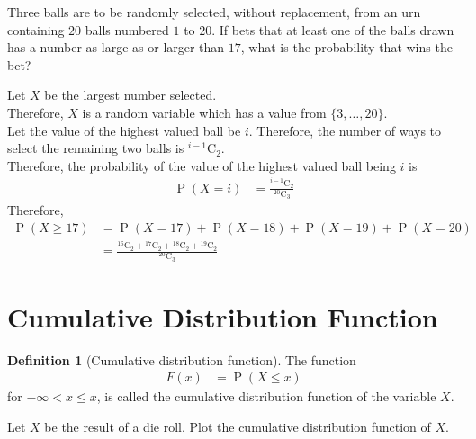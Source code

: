 \documentclass[titlepage, fleqn, a4paper, 12pt, twoside]{article}
\theoremstyle{definition}
\newtheorem{definition}{Definition}
\theoremstyle{theorem}
\DeclareMathOperator{\prob}{\mathrm{P}}
\newcommand*{\comb}[2]{{}^{#1}\mathrm{C}_{#2}}%
\newcommand{\A}{\text{Alice}\xspace}
\begin{document}
\begin{question}
	Three balls are to be randomly selected, without replacement, from an urn containing $20$ balls numbered $1$ to $20$.
	If \A bets that at least one of the balls drawn has a number as large as or larger than $17$, what is the probability that \A wins the bet?
\end{question}

\begin{solution}
	Let $X$ be the largest number selected.\\
	Therefore, $X$ is a random variable which has a value from $\{3,\dots,20\}$.\\
	Let the value of the highest valued ball be $i$.
	Therefore, the number of ways to select the remaining two balls is $\comb{i - 1}{2}$.\\
	Therefore, the probability of the value of the highest valued ball being $i$ is
	\begin{align*}
		\prob(X = i) & = \frac{\comb{i - 1}{2}}{\comb{20}{3}}
	\end{align*}
	Therefore,
	\begin{align*}
		\prob(X \ge 17) & = \prob(X = 17) + \prob(X = 18) + \prob(X = 19) + \prob(X = 20) \\
                                & = \frac{\comb{16}{2} + \comb{17}{2} + \comb{18}{2} + \comb{19}{2}}{\comb{20}{3}}
	\end{align*}
\end{solution}

\section{Cumulative Distribution Function}

\begin{definition}[Cumulative distribution function]
	The function
	\begin{align*}
		F(x) & = \prob(X \le x)
	\end{align*}
	for $-\infty < x \le x$, is called the cumulative distribution function of the variable $X$.
\end{definition}

\begin{question}
	Let $X$ be the result of a die roll.
	Plot the cumulative distribution function of $X$.
\end{question}
\end{document}
